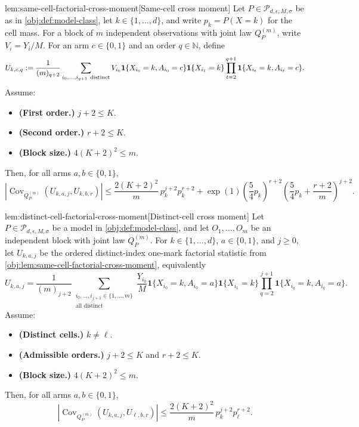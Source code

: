 \begin{lemmav}{lem:same-cell-factorial-cross-moment}[Same-cell cross moment]
Let \(P\in\mathcal P_{d,\epsilon,M,\sigma}\) be as in \cref{obj:def:model-class}, let \(k\in\{1,\ldots,d\}\), and write \(p_k=P(X=k)\) for the cell mass.  For a block of \(m\) independent observations with joint law \(Q_P^{(m)}\), write \(V_i=Y_i/M\).  For an arm \(c\in\{0,1\}\) and an order \(q\in\mathbb N\), define
\[
U_{k,c,q}
:=
\frac{1}{(m)_{q+2}}
\sum_{i_0,\ldots,i_{q+1}\ {\rm distinct}}
V_{i_0}\mathbf 1\{X_{i_0}=k,A_{i_0}=c\}
\mathbf 1\{X_{i_1}=k\}
\prod_{t=2}^{q+1}\mathbf 1\{X_{i_t}=k,A_{i_t}=c\}.
\]
Assume:
\begin{itemize}
\item \textbf{(First order.)} \(j+2\le K\).
\item \textbf{(Second order.)} \(r+2\le K\).
\item \textbf{(Block size.)} \(4(K+2)^2\le m\).
\end{itemize}
Then, for all arms \(a,b\in\{0,1\}\),
\[
\left|\operatorname{Cov}_{Q_P^{(m)}}\!\left(U_{k,a,j},U_{k,b,r}\right)\right|
\le
\frac{2(K+2)^2}{m}\,p_k^{j+2}p_k^{r+2}
+
\exp(1)\left(\frac54p_k\right)^{r+2}
\left(\frac54p_k+\frac{r+2}{m}\right)^{j+2}.
\]
\end{lemmav}

\begin{lemmav}{lem:distinct-cell-factorial-cross-moment}[Distinct-cell cross moment]
Let \(P\in\mathcal P_{d,\epsilon,M,\sigma}\) be a model in \cref{obj:def:model-class}, and let \(O_1,\ldots,O_m\) be an independent block with joint law \(Q_P^{(m)}\).  For \(k\in\{1,\ldots,d\}\), \(a\in\{0,1\}\), and \(j\ge 0\), let \(U_{k,a,j}\) be the ordered distinct-index one-mark factorial statistic from \cref{obj:lem:same-cell-factorial-cross-moment}, equivalently
\[
U_{k,a,j}
=
\frac{1}{(m)_{j+2}}
\sum_{\substack{i_0,\ldots,i_{j+1}\in\{1,\ldots,m\}\\ \text{all distinct}}}
\frac{Y_{i_0}}{M}
\mathbf 1\{X_{i_0}=k,A_{i_0}=a\}
\mathbf 1\{X_{i_1}=k\}
\prod_{q=2}^{j+1}\mathbf 1\{X_{i_q}=k,A_{i_q}=a\}.
\]
Assume:
\begin{itemize}
\item \textbf{(Distinct cells.)} \(k\ne \ell\).
\item \textbf{(Admissible orders.)} \(j+2\le K\) and \(r+2\le K\).
\item \textbf{(Block size.)} \(4(K+2)^2\le m\).
\end{itemize}
Then, for all arms \(a,b\in\{0,1\}\),
\[
\left|
\operatorname{Cov}_{Q_P^{(m)}}\!\left(U_{k,a,j},U_{\ell,b,r}\right)
\right|
\le
\frac{2(K+2)^2}{m}\,
p_k^{j+2}p_{\ell}^{r+2}.
\]
\end{lemmav}

